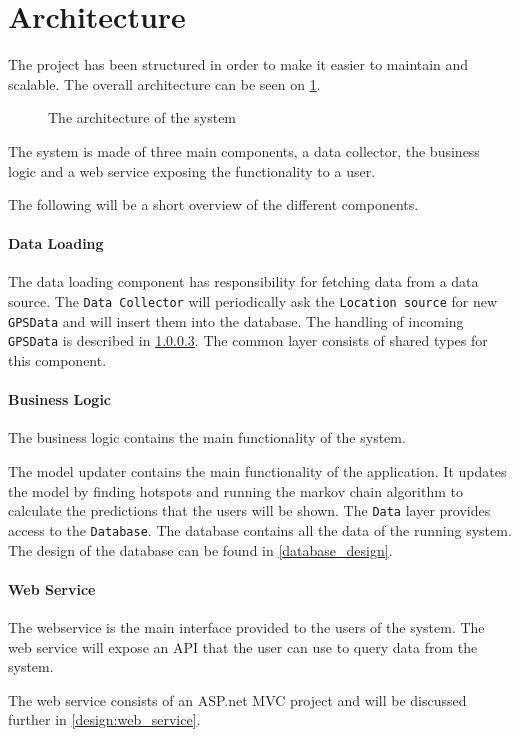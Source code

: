 \section{Architecture}

The project has been structured in order to make it easier to maintain and scalable.
The overall architecture can be seen on \cref{arch}.

\begin{figure}[h]
\center

\caption{The architecture of the system}
\label{arch}
\end{figure}

The system is made of three main components, a data collector, the business logic and a web service exposing the functionality to a user.

The following will be a short overview of the different components.

\paragraph{Data Loading}
The data loading component has responsibility for fetching data from a data source.
The \texttt{Data Collector} will periodically ask the \texttt{Location source} for new \texttt{GPSData} and will insert them into the database. 
The handling of incoming \texttt{GPSData} is described in  \cref{}.
The common layer consists of shared types for this component.

\paragraph{Business Logic}
The business logic contains the main functionality of the system.

The model updater contains the main functionality of the application.
It updates the model by finding hotspots and running the markov chain algorithm to calculate the predictions that the users will be shown.
The \texttt{Data} layer provides access to the \texttt{Database}.
The database contains all the data of the running system.
The design of the database can be found in \cref{database_design}.

\paragraph{Web Service}
The webservice is the main interface provided to the users of the system.
The web service will expose an API that the user can use to query data from the system.

The web service consists of an ASP.net MVC project and will be discussed further in \cref{design:web_service}.





